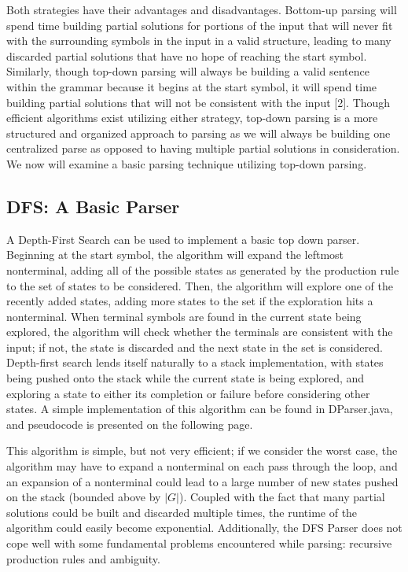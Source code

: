 \documentclass[a4paper, 11pt]{article}
\begin{document}
Both strategies have their advantages and disadvantages. Bottom-up parsing will spend time building partial solutions for portions of the input that will never fit with the 
surrounding symbols in the input in a valid structure, leading to many discarded partial solutions that have no hope of reaching the start symbol. Similarly, though top-down
parsing will always be building a valid sentence within the grammar because it begins at the start symbol, it will spend time building partial solutions that will not be 
consistent with the input [2]. Though efficient algorithms exist utilizing either strategy, top-down parsing is a more structured and organized approach to parsing as we
will always be building one centralized parse as opposed to having multiple partial solutions in consideration. We now will examine a basic parsing technique utilizing
top-down parsing.

\subsection{DFS: A Basic Parser}
A Depth-First Search can be used to implement a basic top down parser. Beginning at the start symbol, the algorithm will expand the leftmost nonterminal, adding all of
the possible states as generated by the production rule to the set of states to be considered. Then, the algorithm will explore one of the recently added states, adding
more states to the set if the exploration hits a nonterminal. When terminal symbols are found in the current state being explored, the algorithm will check whether the
terminals are consistent with the input; if not, the state is discarded and the next state in the set is considered. Depth-first search lends itself naturally to a stack
implementation, with states being pushed onto the stack while the current state is being explored, and exploring a state to either its completion or failure before considering
other states. A simple implementation of this algorithm can be found in DParser.java, and pseudocode is presented on the following page.

This algorithm is simple, but not very efficient; if we consider the worst case, the algorithm may have to expand a nonterminal on each pass through the loop, and an
expansion of a nonterminal could lead to a large number of new states pushed on the stack (bounded above by $|G|$). Coupled with the fact that many partial solutions could
be built and discarded multiple times, the runtime of the algorithm could easily become exponential. Additionally, the DFS Parser does not cope well with some
fundamental problems encountered while parsing: recursive production rules and ambiguity. 
\end{document}
